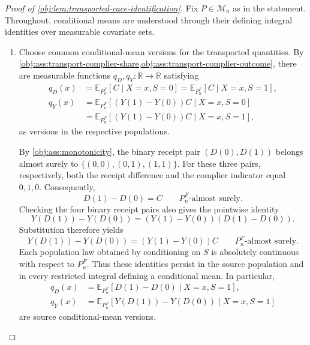 \documentclass[11pt]{article}
\begin{document}
\begin{proof}[Proof of \cref{obj:lem:transported-cace-identification}]
Fix \(P\in\mathcal M_n\) as in the statement. Throughout, conditional means are understood through their defining integral identities over measurable covariate sets.

\begin{enumerate}
\item Choose common conditional-mean versions for the transported quantities. By \cref{obj:ass:transport-complier-share,obj:ass:transport-complier-outcome}, there are measurable functions \(q_D,q_Y:\mathbb R\to\mathbb R\) satisfying
\[
\begin{aligned}
q_D(x)
&=\mathbb E_{P_n^F}[C\mid X=x,S=0]
 =\mathbb E_{P_n^F}[C\mid X=x,S=1],\\
q_Y(x)
&=\mathbb E_{P_n^F}[(Y(1)-Y(0))C\mid X=x,S=0]\\
&=\mathbb E_{P_n^F}[(Y(1)-Y(0))C\mid X=x,S=1],
\end{aligned}
\]
as versions in the respective populations.

By \cref{obj:ass:monotonicity}, the binary receipt pair
\((D(0),D(1))\) belongs almost surely to
\(\{(0,0),(0,1),(1,1)\}\). For these three pairs, respectively, both the receipt difference and the complier indicator equal \(0,1,0\). Consequently,
\[
D(1)-D(0)=C
\qquad P_n^F\text{-almost surely}.
\]
Checking the four binary receipt pairs also gives the pointwise identity
\[
Y(D(1))-Y(D(0))
=(Y(1)-Y(0))(D(1)-D(0)).
\]
Substitution therefore yields
\[
Y(D(1))-Y(D(0))=(Y(1)-Y(0))C
\qquad P_n^F\text{-almost surely}.
\]
Each population law obtained by conditioning on \(S\) is absolutely continuous with respect to \(P_n^F\). Thus these identities persist in the source population and in every restricted integral defining a conditional mean. In particular,
\[
\begin{aligned}
q_D(x)&=\mathbb E_{P_n^F}[D(1)-D(0)\mid X=x,S=1],\\
q_Y(x)&=\mathbb E_{P_n^F}[Y(D(1))-Y(D(0))\mid X=x,S=1]
\end{aligned}
\]
are source conditional-mean versions.


\end{enumerate}
\end{proof}
\end{document}
